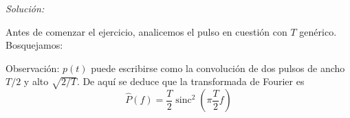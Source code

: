 \documentclass[a4paper,11pt]{article}
\DeclareMathOperator{\sinc}{sinc}
\newenvironment{solucion}[1][]{
\noindent \large \textsl{Solución:} \ifthenelse{\equal{#1}{}}{}{\emph{(#1)}}

\smallskip
}{
\bigskip
}
\begin{document}
\begin{solucion}
Antes de comenzar el ejercicio, analicemos el pulso en cuestión con $T$ genérico. Bosquejamos:
\begin{center}
\end{center}

Observación: $p(t)$ puede escribirse como la convolución de dos pulsos de ancho $T/2$ y alto $\sqrt{2/T}$. De aquí se deduce que la transformada de Fourier es
\begin{equation*}
        \hat{P}(f) = \frac{T}{2}\sinc^2\left(\pi \frac{T}{2} f\right)
\end{equation*}

\begin{enumerate}


\end{enumerate}
\end{solucion}
\end{document}
